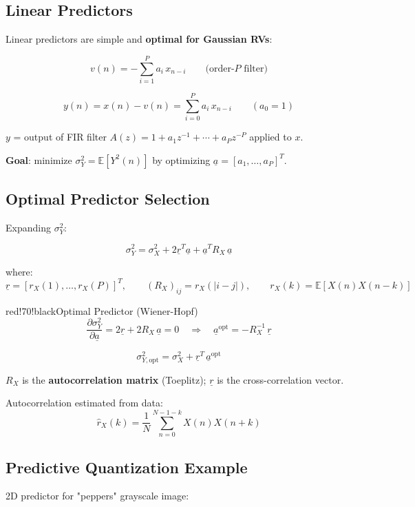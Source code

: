 \subsection{Linear Predictors}

Linear predictors are simple and \textbf{optimal for Gaussian RVs}:

\[
v(n) = -\sum_{i=1}^{P} a_i\, x_{n-i} \qquad \text{(order-$P$ filter)}
\]

\[
y(n) = x(n) - v(n) = \sum_{i=0}^{P} a_i\, x_{n-i} \qquad (a_0 = 1)
\]

$y$ = output of FIR filter $A(z) = 1 + a_1 z^{-1} + \cdots + a_P z^{-P}$ applied to $x$.

\textbf{Goal}: minimize $\sigma_Y^2 = \mathbb{E}[Y^2(n)]$ by optimizing $\underline{a} = [a_1,\ldots,a_P]^T$.

\subsection{Optimal Predictor Selection}

Expanding $\sigma_Y^2$:

\[
\sigma_Y^2 = \sigma_X^2 + 2\underline{r}^T\underline{a} + \underline{a}^T R_X\,\underline{a}
\]

where:
\[
\underline{r} = [r_X(1),\ldots,r_X(P)]^T, \qquad (R_X)_{ij} = r_X(|i-j|), \qquad r_X(k) = \mathbb{E}[X(n)X(n-k)]
\]

\begin{calloutbox}{red!70!black}{Optimal Predictor (Wiener-Hopf)}
\[
\frac{\partial\sigma_Y^2}{\partial\underline{a}} = 2\underline{r} + 2R_X\,\underline{a} = 0 \quad \Rightarrow \quad \underline{a}^{\mathrm{opt}} = -R_X^{-1}\,\underline{r}
\]

\[
\sigma_{Y,\mathrm{opt}}^2 = \sigma_X^2 + \underline{r}^T\,\underline{a}^{\mathrm{opt}}
\]

$R_X$ is the \textbf{autocorrelation matrix} (Toeplitz); $\underline{r}$ is the cross-correlation vector.
\end{calloutbox}

Autocorrelation estimated from data:
\[
\hat{r}_X(k) = \frac{1}{N}\sum_{n=0}^{N-1-k} X(n)X(n+k)
\]

\subsection{Predictive Quantization Example}

2D predictor for "peppers" grayscale image:

